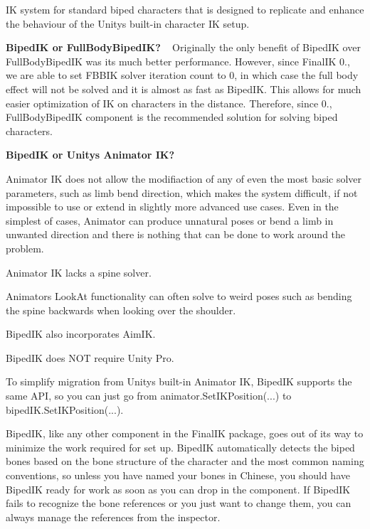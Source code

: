 IK system for standard biped characters that is designed to replicate and enhance the behaviour of the Unity\textquotesingle{}s built-\/in character IK setup.

{\bfseries Biped\+IK or Full\+Body\+Biped\+IK?} ~\newline
Originally the only benefit of Biped\+IK over Full\+Body\+Biped\+IK was it\textquotesingle{}s much better performance. However, since Final\+IK 0., we are able to set F\+B\+B\+IK solver iteration count to 0, in which case the full body effect will not be solved and it is almost as fast as Biped\+IK. This allows for much easier optimization of IK on characters in the distance. Therefore, since 0., Full\+Body\+Biped\+IK component is the recommended solution for solving biped characters.

{\bfseries Biped\+IK or Unity\textquotesingle{}s Animator IK?}
\begin{DoxyItemize}
\item Animator IK does not allow the modifiaction of any of even the most basic solver parameters, such as limb bend direction, which makes the system difficult, if not impossible to use or extend in slightly more advanced use cases. Even in the simplest of cases, Animator can produce unnatural poses or bend a limb in unwanted direction and there is nothing that can be done to work around the problem.
\item Animator IK lacks a spine solver.
\item Animator\textquotesingle{}s Look\+At functionality can often solve to weird poses such as bending the spine backwards when looking over the shoulder.
\item Biped\+IK also incorporates Aim\+IK.
\item Biped\+IK does N\+OT require Unity Pro.
\end{DoxyItemize}

To simplify migration from Unity\textquotesingle{}s built-\/in Animator IK, Biped\+IK supports the same A\+PI, so you can just go from animator.\+Set\+I\+K\+Position(...) to biped\+I\+K.\+Set\+I\+K\+Position(...).

Biped\+IK, like any other component in the Final\+IK package, goes out of it\textquotesingle{}s way to minimize the work required for set up. Biped\+IK automatically detects the biped bones based on the bone structure of the character and the most common naming conventions, so unless you have named your bones in Chinese, you should have Biped\+IK ready for work as soon as you can drop in the component. If Biped\+IK fails to recognize the bone references or you just want to change them, you can always manage the references from the inspector.



